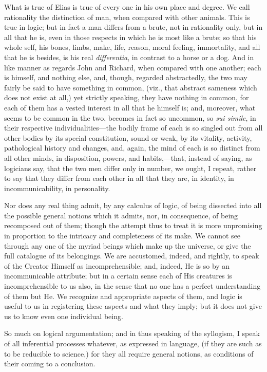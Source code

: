 What is true of Elias is true of every one in his own place and
degree. We call rationality the distinction of man, when compared with
other animals. This is true in logic; but in fact a man differs
from a brute, not in rationality only, but in all that he is, even in
those respects in which he is most like a brute; so that his whole
self, his bones, limbs, make, life, reason, moral feeling,
immortality, and all that he is besides, is his real \emph{differentia},
in contrast to a horse or a dog. And in like manner as regards John
and Richard, when compared with one another; each is himself, and
nothing else, and, though, regarded abstractedly, the two may fairly
be said to have something in common, (viz., that abstract sameness
which does not exist at all,) yet strictly speaking, they have nothing
in common, for each of them has a vested interest in all that he
himself is; and, moreover, what seems to be common in the two, becomes
in fact so uncommon, so \emph{sui simile}, in their respective
individualities—the bodily frame of each is so singled out from all
other bodies by its special constitution, sound or weak, by its
vitality, activity, pathological history and changes, and, again, the
mind of each is so distinct from all other minds, in disposition,
powers, and habits,—that, instead of saying, as logicians say, that
the two men differ only in number, we ought, I repeat, rather to say
that they differ from each other in all that they are, in identity, in
incommunicability, in personality.

Nor does any real thing admit, by any calculus of logic, of being
dissected into all the possible general notions which it admits, nor,
in consequence, of being recomposed out of them; though the attempt
thus to treat it is more unpromising in proportion to the intricacy
and completeness of its make. We cannot see through any one of
the myriad beings which make up the universe, or give the full
catalogue of its belongings. We are accustomed, indeed, and rightly,
to speak of the Creator Himself as incomprehensible; and, indeed, He
is so by an incommunicable attribute; but in a certain sense each of
His creatures is incomprehensible to us also, in the sense that no one
has a perfect understanding of them but He. We recognize and
appropriate aspects of them, and logic is useful to us in registering
these aspects and what they imply; but it does not give us to know
even one individual being.

So much on logical argumentation; and in thus speaking of the
syllogism, I speak of all inferential processes whatever, as expressed
in language, (if they are such as to be reducible to science,) for
they all require general notions, as conditions of their coming to a
conclusion.

